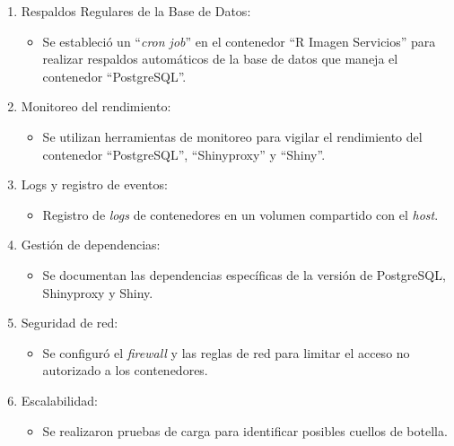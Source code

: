 \documentclass[
  12pt,
  openany]{book}
\providecommand{\tightlist}{%
  \setlength{\itemsep}{0pt}\setlength{\parskip}{0pt}}
\begin{document}
\begin{enumerate}
\def\labelenumi{\arabic{enumi}.}
\item
  Respaldos Regulares de la Base de Datos:

  \begin{itemize}
  \tightlist
  \item
    Se estableció un ``\emph{cron job}'' en el contenedor ``R Imagen Servicios'' para realizar respaldos automáticos de la base de datos que maneja el contenedor ``PostgreSQL''.
  \end{itemize}
\item
  Monitoreo del rendimiento:

  \begin{itemize}
  \tightlist
  \item
    Se utilizan herramientas de monitoreo para vigilar el rendimiento del contenedor ``PostgreSQL'', ``Shinyproxy'' y ``Shiny''.
  \end{itemize}
\item
  Logs y registro de eventos:

  \begin{itemize}
  \item
    Registro de \emph{logs} de contenedores en un volumen compartido con el \emph{host}.

    \newpage
  \end{itemize}
\item
  Gestión de dependencias:

  \begin{itemize}
  \tightlist
  \item
    Se documentan las dependencias específicas de la versión de PostgreSQL, Shinyproxy y Shiny.
  \end{itemize}
\item
  Seguridad de red:

  \begin{itemize}
  \tightlist
  \item
    Se configuró el \emph{firewall} y las reglas de red para limitar el acceso no autorizado a los contenedores.
  \end{itemize}
\item
  Escalabilidad:

  \begin{itemize}
  \tightlist
  \item
    Se realizaron pruebas de carga para identificar posibles cuellos de botella.
  \end{itemize}
\end{enumerate}
\end{document}
